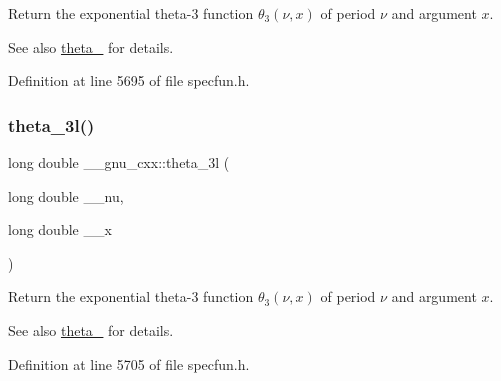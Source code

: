 Return the exponential theta-\/3 function $ \theta_3(\nu,x) $ of period $ \nu $ and argument $ x $.

\begin{DoxySeeAlso}{See also}
\hyperlink{group__gnu__math__spec__func_ga146c3b8e86991e164d4bf143cda5f0fc}{theta\+\_} for details. 
\end{DoxySeeAlso}


Definition at line 5695 of file specfun.\+h.

\mbox{\label{group__gnu__math__spec__func_gaf88874ff6c69940d2191f7947d2ea119}} 
\subsubsection{\texorpdfstring{theta\+\_\+3l()}{theta\_3l()}}
{\footnotesize\ttfamily long double \+\_\+\+\_\+gnu\+\_\+cxx\+::theta\+\_\+3l (\begin{DoxyParamCaption}\item[{long double}]{\+\_\+\+\_\+nu,  }\item[{long double}]{\+\_\+\+\_\+x }\end{DoxyParamCaption})\hspace{0.3cm}{\ttfamily [inline]}}

Return the exponential theta-\/3 function $ \theta_3(\nu,x) $ of period $ \nu $ and argument $ x $.

\begin{DoxySeeAlso}{See also}
\hyperlink{group__gnu__math__spec__func_ga146c3b8e86991e164d4bf143cda5f0fc}{theta\+\_} for details. 
\end{DoxySeeAlso}


Definition at line 5705 of file specfun.\+h.

\mbox{\label{group__gnu__math__spec__func_ga8a6f8b69272a9f205a13e1745832ada3}} 
